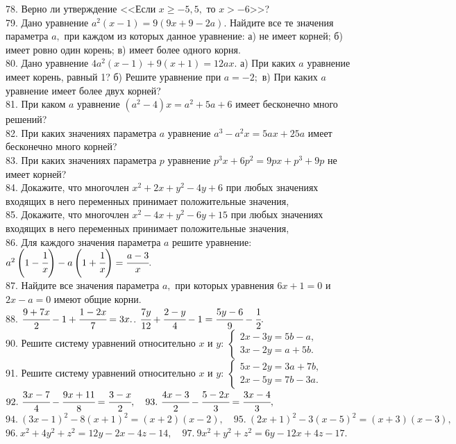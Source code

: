 \documentclass[12pt]{article}
\begin{document}
78. Верно ли утверждение <<Если $x\geqslant-5,5,$ то $x>-6$>>?\\
79. Дано уравнение $a^2(x-1)=9(9x+9-2a).$ Найдите все те значения параметра $a,$ при каждом из которых данное уравнение: а) не имеет корней; б) имеет ровно один корень; в) имеет более одного корня.\\
80. Дано уравнение $4a^2(x-1)+9(x+1)=12ax.$ а) При каких $a$ уравнение имеет корень, равный 1? б) Решите уравнение при $a=-2;$ в) При каких $a$ уравнение имеет более двух корней?\\
81. При каком $a$ уравнение $(a^2-4)x=a^2+5a+6$ имеет бесконечно много решений?\\
82. При каких значениях параметра $a$ уравнение $a^3-a^2x=5ax+25a$ имеет бесконечно много корней?\\
83. При каких значениях параметра $p$ уравнение $p^3x+6p^2=9px+p^3+9p$ не имеет корней?\\
84. Докажите, что многочлен $x^2+2x+y^2-4y+6$ при любых значениях входящих в него переменных принимает положительные значения,\\
85. Докажите, что многочлен $x^2-4x+y^2-6y+15$ при любых значениях входящих в него переменных принимает положительные значения,\\
86. Для каждого значения параметра $a$ решите уравнение: $a^2\left(1-\cfrac{1}{x}\right)-a\left(1+\cfrac{1}{x}\right)=\cfrac{a-3}{x}.$\\
87. Найдите все значения параметра $a,$ при которых уравнения $6x+1=0$ и $2x-a=0$ имеют общие корни.\\
88. $\cfrac{9+7x}{2}-1+\cfrac{1-2x}{7}=3x.$\qquad{}. $\cfrac{7y}{12}+\cfrac{2-y}{4}-1=\cfrac{5y-6}{9}-\cfrac{1}{2}.$\\
90. Решите систему уравнений относительно $x$ и $y:\ \begin{cases}2x-3y=5b-a,\\ 3x-2y=a+5b. \end{cases}$\\
91. Решите систему уравнений относительно $x$ и $y:\ \begin{cases}5x-2y=3a+7b,\\ 2x-5y=7b-3a. \end{cases}$\\
$92.\ \cfrac{3x-7}{4}-\cfrac{9x+11}{8}=\cfrac{3-x}{2}, \quad 93.\ \cfrac{4x-3}{2}-\cfrac{5-2x}{3}=\cfrac{3x-4}{3},$\\
$94.\ (3x-1)^2-8(x+1)^2=(x+2)(x-2), \quad 95.\ (2x+1)^2-3(x-5)^2=(x+3)(x-3),$\\
$96.\ x^2+4y^2+z^2=12y-2x-4z-14, \quad 97.\ 9x^2+y^2+z^2=6y-12x+4z-17.$\\
\end{document}
